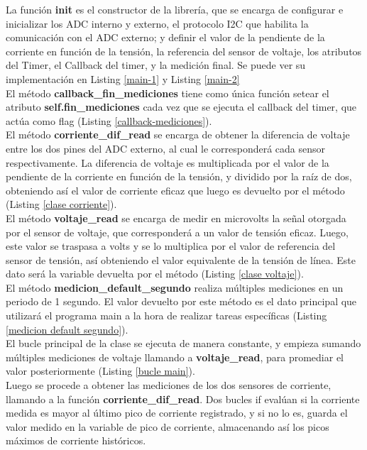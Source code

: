 La función \textbf{init} es el constructor de la librería, que se encarga de configurar e inicializar los ADC interno y externo, el protocolo I2C que habilita la comunicación con el ADC externo; y definir el valor de la pendiente de la corriente en función de la tensión, la referencia del sensor de voltaje, los atributos del Timer, el Callback del timer, y la medición final. Se puede ver su implementación en Listing \ref{main-1} y Listing \ref{main-2}\\

El método \textbf{callback\_fin\_mediciones} tiene como única función setear el atributo \textbf{self.fin\_mediciones} cada vez que se ejecuta el callback del timer, que actúa como flag (Listing \ref{callback-mediciones}).\\

El método \textbf{corriente\_dif\_read} se encarga de obtener la diferencia de voltaje entre los dos pines del ADC externo, al cual le corresponderá cada sensor respectivamente. La diferencia de voltaje es multiplicada por el valor de la pendiente de la corriente en función de la tensión, y dividido por la raíz de dos, obteniendo así el valor de corriente eficaz que luego es devuelto por el método (Listing \ref{clase corriente}).\\

El método \textbf{voltaje\_read} se encarga de medir en microvolts la señal otorgada por el sensor de voltaje, que corresponderá a un valor de tensión eficaz. Luego, este valor se traspasa a volts y se lo multiplica por el valor de referencia del sensor de tensión, así obteniendo el valor equivalente de la tensión de línea. Este dato será la variable devuelta por el método (Listing \ref{clase voltaje}).\\

El método \textbf{medicion\_default\_segundo} realiza múltiples mediciones en un periodo de 1 segundo. El valor devuelto por este método es el dato principal que utilizará el programa main a la hora de realizar tareas específicas (Listing \ref{medicion default segundo}).\\

El bucle principal de la clase se ejecuta de manera constante, y empieza sumando múltiples mediciones de voltaje llamando a \textbf{voltaje\_read}, para promediar el valor posteriormente (Listing \ref{bucle main}).\\

Luego se procede a obtener las mediciones de los dos sensores de corriente, llamando a la función \textbf{corriente\_dif\_read}. Dos bucles if evalúan si la corriente medida es mayor al último pico de corriente registrado, y si no lo es, guarda el valor medido en la variable de pico de corriente, almacenando así los picos máximos de corriente históricos.\\

